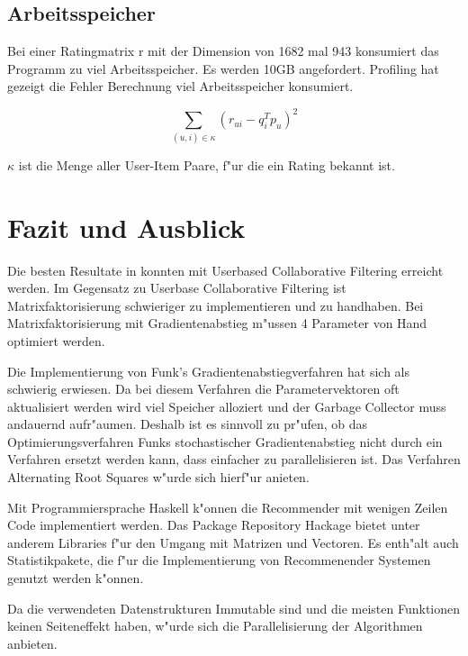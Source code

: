 \documentclass[a4paper, 12pt]{article}
\begin{document}
\subsection{Arbeitsspeicher}
\label{sec:memory}

Bei einer Ratingmatrix r mit der Dimension von 1682 mal 943 konsumiert das Programm zu viel Arbeitsspeicher. Es werden 10GB angefordert. Profiling hat gezeigt die Fehler Berechnung viel Arbeitsspeicher konsumiert.

\begin{equation}
  \label{eq:squareerror}
  \sum_{(u,i) \in \kappa} (r_{ui} - q_i^T p_u)^2
\end{equation}

$\kappa$ ist die Menge aller User-Item Paare, f"ur die ein Rating bekannt ist.

\section{Fazit und Ausblick}
\label{sec:fazit}

Die besten Resultate in konnten mit Userbased Collaborative Filtering erreicht werden. Im Gegensatz zu Userbase Collaborative Filtering ist Matrixfaktorisierung schwieriger zu implementieren und zu handhaben. Bei Matrixfaktorisierung mit Gradientenabstieg m"ussen 4 Parameter von Hand optimiert werden.

Die Implementierung von Funk's Gradientenabstiegverfahren hat sich als schwierig erwiesen. Da bei diesem Verfahren die Parametervektoren oft aktualisiert werden wird viel Speicher alloziert und der Garbage Collector muss andauernd aufr"aumen. Deshalb ist es sinnvoll zu pr"ufen, ob das Optimierungsverfahren Funks stochastischer Gradientenabstieg nicht durch ein Verfahren ersetzt werden kann, dass einfacher zu parallelisieren ist. Das Verfahren Alternating Root Squares w"urde sich hierf"ur anieten.

Mit Programmiersprache Haskell k"onnen die Recommender mit wenigen Zeilen Code implementiert werden. Das Package Repository Hackage bietet unter anderem Libraries f"ur den Umgang mit Matrizen und Vectoren. Es enth"alt auch Statistikpakete, die f"ur die Implementierung von Recommenender Systemen genutzt werden k"onnen.

Da die verwendeten Datenstrukturen Immutable sind und die meisten Funktionen keinen Seiteneffekt haben, w"urde sich die Parallelisierung der Algorithmen anbieten.



\end{document}
